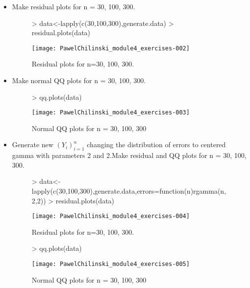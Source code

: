 \documentclass[a4paper]{article}
\begin{document}
\begin{itemize}
\item Make residual plots for n = 30, 100, 300.
  
\begin{figure}[H]
\begin{center}
\begin{Schunk}
\begin{Sinput}
> data<-lapply(c(30,100,300),generate.data)
> residual.plots(data)
\end{Sinput}
\end{Schunk}
\texttt{[image: PawelChilinski\_module4\_exercises-002]}
\caption{Residual plots for n=30, 100, 300.}
\end{center}
\end{figure}

\item Make normal QQ plots for n = 30, 100, 300.
\begin{figure}[H]
\begin{center}
\begin{Schunk}
\begin{Sinput}
> qq.plots(data)
\end{Sinput}
\end{Schunk}
\texttt{[image: PawelChilinski\_module4\_exercises-003]}
\caption{Normal QQ plots for n = 30, 100, 300}
\end{center}
\end{figure}

\item Generate new $(Y_i)_{i=1}^n$ changing the distribution of errors to
centered gamma with parameters 2 and 2.Make residual and QQ plots for n = 30,
100, 300.

\begin{figure}[H]
\begin{center}
\begin{Schunk}
\begin{Sinput}
> data<-lapply(c(30,100,300),generate.data,errors=function(n){rgamma(n,2,2)})
> residual.plots(data)
\end{Sinput}
\end{Schunk}
\texttt{[image: PawelChilinski\_module4\_exercises-004]}
\caption{Residual plots for n=30, 100, 300.}
\end{center}
\end{figure}

\begin{figure}[H]
\begin{center}
\begin{Schunk}
\begin{Sinput}
> qq.plots(data)
\end{Sinput}
\end{Schunk}
\texttt{[image: PawelChilinski\_module4\_exercises-005]}
\caption{Normal QQ plots for n = 30, 100, 300}
\end{center}
\end{figure}


\end{itemize}
\end{document}
